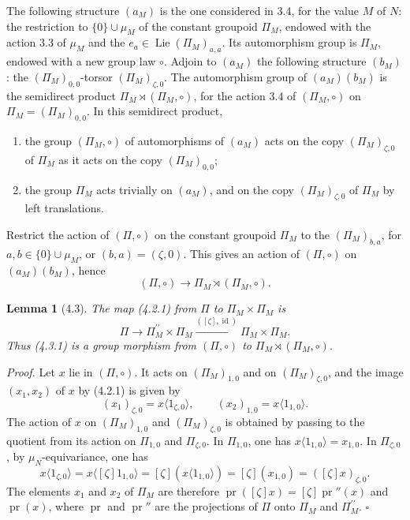 \documentclass[10pt,a4paper]{article}
\newcommand{\Lie}{\operatorname{Lie}}
\newcommand{\Id}{\operatorname{id}}
\theoremstyle{deligne}
\newtheorem*{lemma*}{Lemma}
\newenvironment{proofdel}{\textit{Proof.}}{\hfill$\square$}
\begin{document}
The following structure \((a_M)\) is the one considered in 3.4, for the value \(M\) of \(N\): the restriction to \(\{0\}\cup\mu_M\) of the constant groupoid \(\Pi_M\), endowed with the action 3.3 of \(\mu_M\) and the \(e_a\in\Lie(\Pi_M)_{a,a}\). Its automorphism group is \(\Pi_M\), endowed with a new group law \(\circ\). Adjoin to \((a_M)\) the following structure \((b_M)\): the \((\Pi_M)_{0,0}\)-torsor \((\Pi_M)_{\zeta,0}\). The automorphism group of \((a_M)(b_M)\) is the semidirect product \(\Pi_M\rtimes(\Pi_M,\circ)\), for the action 3.4 of \((\Pi_M,\circ)\) on \(\Pi_M=(\Pi_M)_{0,0}\). In this semidirect product,
\begin{enumerate}[label=(\alph*'\textsubscript{\(M\)}),leftmargin=2.8em]
\item the group \((\Pi_M,\circ)\) of automorphisms of \((a_M)\) acts on the copy \((\Pi_M)_{\zeta,0}\) of \(\Pi_M\) as it acts on the copy \((\Pi_M)_{0,0}\);
\item the group \(\Pi_M\) acts trivially on \((a_M)\), and on the copy \((\Pi_M)_{\zeta,0}\) of \(\Pi_M\) by left translations.
\end{enumerate}
Restrict the action of \((\Pi,\circ)\) on the constant groupoid \(\Pi_M\) to the \((\Pi_M)_{b,a}\), for \(a,b\in\{0\}\cup\mu_M\), or \((b,a)=(\zeta,0)\). This gives an action of \((\Pi,\circ)\) on \((a_M)(b_M)\), hence
\[
\tag{4.2.1}
(\Pi,\circ)\longrightarrow \Pi_M\rtimes(\Pi_M,\circ).
\]

\begin{lemma*}[4.3]
The map (4.2.1) from \(\Pi\) to \(\Pi_M\times\Pi_M\) is
\[
\tag{4.3.1}
\Pi\longrightarrow \Pi_M^{\prime\prime}\times\Pi_M
\overset{([\zeta],\Id)}{\longrightarrow}\Pi_M\times\Pi_M.
\]
Thus (4.3.1) is a group morphism from \((\Pi,\circ)\) to \(\Pi_M\rtimes(\Pi_M,\circ)\).
\end{lemma*}

\begin{proofdel}
Let \(x\) lie in \((\Pi,\circ)\). It acts on \((\Pi_M)_{1,0}\) and on \((\Pi_M)_{\zeta,0}\), and the image \((x_1,x_2)\) of \(x\) by (4.2.1) is given by
\[
(x_1)_{\zeta,0}=x\langle 1_{\zeta,0}\rangle,\qquad
(x_2)_{1,0}=x\langle 1_{1,0}\rangle .
\]
The action of \(x\) on \((\Pi_M)_{1,0}\) and \((\Pi_M)_{\zeta,0}\) is obtained by passing to the quotient from its action on \(\Pi_{1,0}\) and \(\Pi_{\zeta,0}\). In \(\Pi_{1,0}\), one has \(x\langle1_{1,0}\rangle=x_{1,0}\). In \(\Pi_{\zeta,0}\), by \(\mu_N\)-equivariance, one has
\[
x\langle1_{\zeta,0}\rangle=x\langle[\zeta]1_{1,0}\rangle=[\zeta](x\langle1_{1,0}\rangle)=[\zeta](x_{1,0})=([\zeta]x)_{\zeta,0}.
\]
The elements \(x_1\) and \(x_2\) of \(\Pi_M\) are therefore \(\operatorname{pr}([\zeta]x)=[\zeta]\operatorname{pr}''(x)\) and \(\operatorname{pr}(x)\), where \(\operatorname{pr}\) and \(\operatorname{pr}''\) are the projections of \(\Pi\) onto \(\Pi_M\) and \(\Pi_M^{\prime\prime}\).
\end{proofdel}
\end{document}
